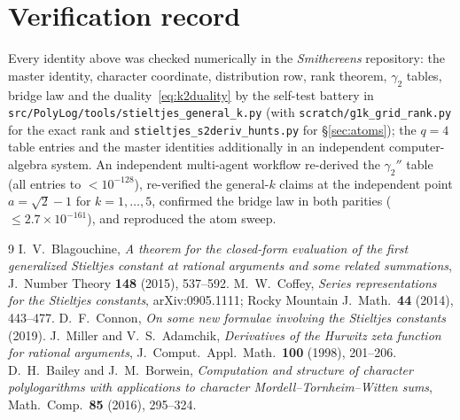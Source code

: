 \documentclass[11pt]{article}
\theoremstyle{remark}
\begin{document}
\section*{Verification record}

Every identity above was checked numerically in the
\emph{Smithereens} repository: the master identity, character coordinate,
distribution row, rank theorem, $\gamma_2$ tables, bridge law and the
duality~\eqref{eq:k2duality} by the self-test battery in
\texttt{src/PolyLog/tools/stieltjes\_general\_k.py} (with
\texttt{scratch/g1k\_grid\_rank.py} for the exact rank and
\texttt{stieltjes\_s2deriv\_hunts.py} for \S\ref{sec:atoms}); the $q=4$ table
entries and the master identities additionally in an independent
computer-algebra system. An independent multi-agent workflow re-derived the
$\gamma_2''$ table (all entries to $<10^{-128}$), re-verified the general-$k$
claims at the independent point $a=\sqrt2-1$ for $k=1,\dots,5$, confirmed the
bridge law in both parities ($\le 2.7\times10^{-161}$), and reproduced the atom
sweep.

\begin{thebibliography}{9}
 I.~V.~Blagouchine,
  \emph{A theorem for the closed-form evaluation of the first generalized
  Stieltjes constant at rational arguments and some related summations},
  J.\ Number Theory \textbf{148} (2015), 537--592.
 M.~W.~Coffey,
  \emph{Series representations for the Stieltjes constants},
  arXiv:0905.1111; Rocky Mountain J.\ Math.\ \textbf{44} (2014), 443--477.
 D.~F.~Connon,
  \emph{On some new formulae involving the Stieltjes constants} (2019).
 J.~Miller and V.~S.~Adamchik,
  \emph{Derivatives of the Hurwitz zeta function for rational arguments},
  J.\ Comput.\ Appl.\ Math.\ \textbf{100} (1998), 201--206.
 D.~H.~Bailey and J.~M.~Borwein,
  \emph{Computation and structure of character polylogarithms with
  applications to character Mordell--Tornheim--Witten sums},
  Math.\ Comp.\ \textbf{85} (2016), 295--324.
\end{thebibliography}
\end{document}
